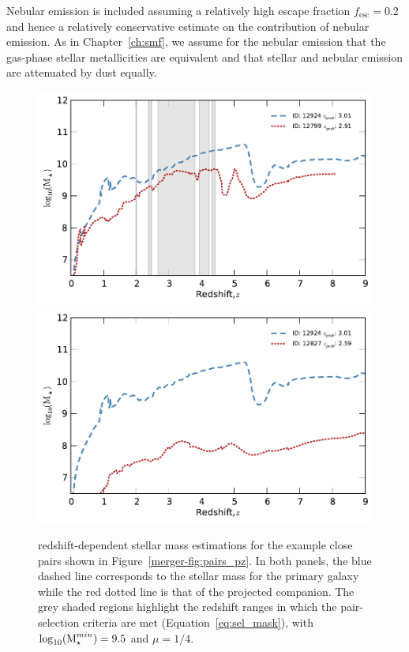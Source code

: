 Nebular emission is included assuming a relatively high escape fraction $f_{\text{esc}} = 0.2$ \citep{Yajima:2010fb,Fernandez:2011cw,Finkelstein:2012hr,Robertson:2013ji} and hence a relatively conservative estimate on the contribution of nebular emission. As in Chapter~\ref{ch:smf}, we assume for the nebular emission that the gas-phase stellar metallicities are equivalent and that stellar and nebular emission are attenuated by dust equally.

\begin{figure}
\centering
\includegraphics[width=0.9\columnwidth]{plots/PairsMass_pri_81_2.pdf}
\includegraphics[width=0.9\columnwidth]{plots/PairsMass_pri_81_4.pdf}
  
  \caption[redshift-dependent stellar mass estimations for the example close pairs shown in Figure~\ref{merger-fig:pairs_pz}.]{redshift-dependent stellar mass estimations for the example close pairs shown in Figure~\ref{merger-fig:pairs_pz}. In both panels, the blue dashed line corresponds to the stellar mass for the primary galaxy while the red dotted line is that of the projected companion. The grey shaded regions highlight the redshift ranges in which the pair-selection criteria are met (Equation~\ref{eq:sel_mask}), with $\log_{10}(\text{M}_{\star}^{min}) = 9.5$ and $\mu = 1/4$.}
  \label{merger-fig:pairs_mass}
\end{figure}

